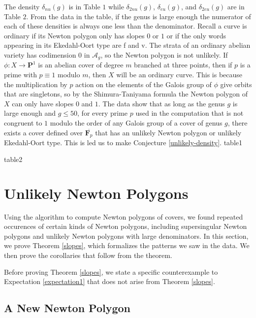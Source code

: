 \documentclass{article}
\theoremstyle{remark}
\theoremstyle{definition}
\begin{document}
\par The density $\delta_{nu}(g)$ is in Table $1$ while $\delta_{2nu}(g)$, $\delta_{eu}(g)$, and $\delta_{2eu}(g)$ are in Table $2$. From the data in the table, if the genus is large enough the numerator of each of these densities is always one less than the denominator. Recall a curve is ordinary if its Newton polygon only has slopes $0$ or $1$ or if the only words appearing in its Ekedahl-Oort type are f and v. The strata of an ordinary abelian variety has codimension $0$ in $\mathcal{A}_g$, so the Newton polygon is not unlikely. If $\phi: X \to \mathbf{P}^1$ is an abelian cover of degree $m$ branched at three points, then if $p$ is a prime with $p \equiv 1$ modulo $m$, then $X$ will be an ordinary curve. This is because the multiplication by $p$ action on the elements of the Galois group of $\phi$ give orbits that are singletons, so by the Shimura-Taniyama formula the Newton polygon of $X$ can only have slopes $0$ and $1$. The data show that as long as the genus $g$ is large enough and $g \leq 50$, for every prime $p$ used in the computation that is not congruent to $1$ modulo the order of any Galois group of a cover of genus $g$, there exists a cover defined over $\overline{\mathbf{F}_p}$ that has an unlikely Newton polygon or unlikely Ekedahl-Oort type. This is led us to make Conjecture \ref{unlikely-density}.
{table1}

{table2}

\section{Unlikely Newton Polygons}

\par \hspace{\parindent}Using the algorithm to compute Newton polygons of covers, we found repeated occurences of certain kinds of Newton polygons, including supersingular Newton polygons and unlikely Newton polygons with large denominators. In this section, we prove Theorem \ref{slopes}, which formalizes the patterns we saw in the data. We then prove the corollaries that follow from the theorem.

\par Before proving Theorem \ref{slopes}, we state a specific counterexample to Expectation \ref{expectation1} that does not arise from Theorem \ref{slopes}.

\subsection{A New Newton Polygon}
\end{document}
